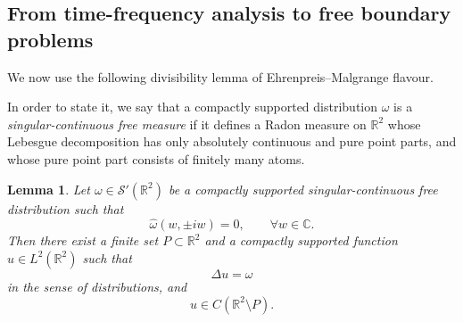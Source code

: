 \documentclass[a4paper,11pt,reqno]{amsart}
\numberwithin{equation}{section}
\theoremstyle{plain} %
\newtheorem{lemma}{Lemma}[section]
\theoremstyle{definition} %
\theoremstyle{remark}
\newcommand{\R}{\mathbb{R}}
\newcommand{\C}{\mathbb{C}}
\begin{document}
\subsection{From time-frequency analysis to free boundary problems} We now use the following divisibility lemma of Ehrenpreis--Malgrange flavour.

In order to state it, we say that a compactly supported distribution $\omega$ is a \emph{singular-continuous free measure} if it defines a Radon measure on $\R^2$ whose Lebesgue decomposition has only absolutely continuous and pure point parts, and whose pure point part consists of finitely many atoms.

\begin{lemma}\label{lemma:fourier-to-fboundary}
Let $\omega\in \mathcal{S}'(\R^2)$ be a compactly supported singular-continuous free distribution such that
\[
\widehat{\omega}(w,\pm iw)=0,\qquad \forall w\in\C.
\]
Then there exist a finite set $P\subset \R^2$ and a compactly supported function $u\in L^2(\R^2)$ such that
\[
\Delta u=\omega
\]
in the sense of distributions, and
\[
u\in C(\R^2\setminus P).
\]
\end{lemma}
\end{document}
